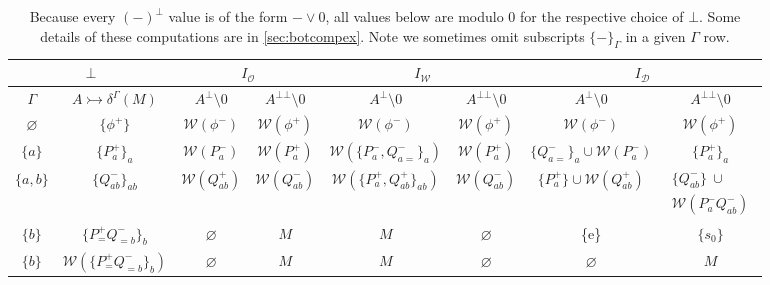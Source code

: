\documentclass{article}
\theoremstyle{definition}
\newcommand{\cD}{\mathcal{D}}
\newcommand{\cO}{\mathcal{O}}
\newcommand{\cW}{\mathcal{W}}
\begin{document}
\begin{table}
    
\vspace{2mm}
\renewcommand{\arraystretch}{1.5}  
\centering 
\hspace{-5mm}
\begin{tabular}{||c|c||c|c|c|c|c|c||}
\hline\hline 
\multicolumn{2}{||c||}{$\bot$} & \multicolumn{2}{|c|}{$I_\cO$} & \multicolumn{2}{|c|}{$I_\cW$} & \multicolumn{2}{|c|}{$I_\cD $} \\
\hline\hline $\Gamma$ & \footnotesize{$A\rightarrowtail \delta^\Gamma(M)$}    & $A^{\bot}\setminus 0$                    & $A^{\bot\bot}\setminus 0$  & $A^{\bot}\setminus 0$                    & $A^{\bot\bot}\setminus 0$  & $A^{\bot}\setminus 0$                    & $A^{\bot\bot}\setminus 0$   \\
\hline $\varnothing$ &  $\{\phi^+\}$       & $\cW(\phi^-)$ &    $\cW(\phi^+)$             & $\cW(\phi^-)$ &     $\cW(\phi^+)$               &  $\cW(\phi^-)$   &   $\cW(\phi^+)$\\
\hline    $\{a\}$    &   $\{P^+_a\}_a$ &  $\cW(P^-_a)$    &   $\cW(P^+_a)$   &   \small{$\cW(\{P^-_a, Q^-_{a=}\}_a)$}            &   $\cW(P^+_a)$  &      \small{$\{Q^-_{a=}\}_{a}\cup\cW(P^-_a)$}              &  $\{P^+_a\}_a$  \\
\hline  \footnotesize{$\{a,b\}$} &  $\{Q^-_{ab}\}_{ab}$    &   $\cW(Q^+_{ab})$    &  $\cW(Q^-_{ab})$  &   \small{$\cW(\{P^+_a,Q^+_{ab}\}_{ab})$}              & \small{$\cW(Q^-_{ab})$} &         \small{$\{P^+_a\}\cup\cW(Q^+_{ab})$}             & $\substack{\{Q^-_{ab}\}\ \cup \\ \cW(P^-_aQ^-_{ab})}$ \\
\hline    $\{b\}$    &   $\{P^+_=Q^-_{=b}\}_b$ & $\varnothing$ & $M$ & $M$ & $\varnothing$ & \{e\}  & $\{s_0\}$  \\
\hline    $\{b\}$    &   \small{$\cW(\{P^+_=Q^-_{=b}\}_b)$} & $\varnothing$ & $M$ & $M$ & $\varnothing$ & $\varnothing$  & $M$  \\
\hline\hline
\end{tabular}
\vspace{2mm}

\caption{Because every $(-)^\bot$ value is of the form $- \vee 0$, all values below are modulo $0$ for the respective choice of $\bot$. Some details of these computations are in \cref{sec:botcompex}. Note we sometimes omit subscripts $\{-\}_\Gamma$ in a given $\Gamma$ row.}
\label{tab:botcomp}

\end{table}
\end{document}
